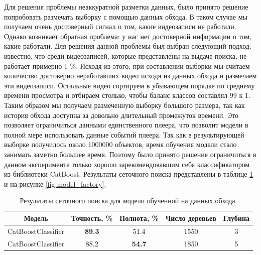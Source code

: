 Для решения проблемы неаккуратной разметки данных, было принято решение попробовать размечать выборку с помощью данных обхода. В таком случае мы получаем очень достоверный сигнал о том, какие видеозаписи не работали. Однако возникает обратная проблема: у нас нет достоверной информации о том, какие работали. Для решения данной проблемы был выбран следующий подход: известно, что среди видеозаписей, которые представлены на выдаче поиска, не работает примерно 1 \%. Исходя из этого, при составлении выборки мы считаем количество достоверно неработавших видео исходя из данных обхода и размечаем эти видеозаписи. Остальные видео сортируем в убывающем порядке по среднему времени просмотра и отбираем столько, чтобы баланс классов составлял 99 к 1. Таким образом мы получаем размеченную выборку большого размера, так как история обхода доступна за довольно длительный промежуток времени. Это позволяет ограничиться данными единственного плеера, что позволит модели в полной мере использовать данные событий плеера. Так как в результирующей выборке получилось около 1000000 объектов, время обучения модели стало занимать заметно большее время. Поэтому было принято решение ограничиться в данном эксперименте только хорошо зарекомендовавшим себя классификатором из библиотеки CatBoost. Результаты сеточного поиска представлены в таблице \ref{tab:model_factory} и на рисунке \ref{fig:model_factory}.

\begin{table}[h]
    \centering
    \begin{tabular}{|c|c|c|c|c|}
        \hline
        Модель & Точность, \% & Полнота, \% & Число деревьев & Глубина \\
        \hline
        CatBoostClassifier & \textbf{89.3} & 51.4 & 1550 & 3 \\
        \hline
        CatBoostClassifier & 88.2 & \textbf{54.7} & 1850 & 5 \\
        \hline
    \end{tabular}
    \caption{Результаты сеточного поиска для модели обученной на данных обхода.}
    \label{tab:model_factory}
\end{table}

